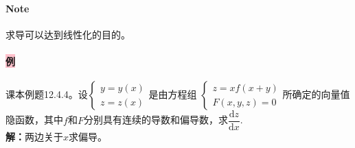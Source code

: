 \documentclass[UTF8]{ctexart}
\renewcommand{\d}{\mathrm{d}}
\begin{document}
        \paragraph{\colorbox{orange!75}{Note}}求导可以达到线性化的目的。

        \paragraph{\colorbox{pink}{例}}课本例题12.4.4。设$\begin{cases}
            y=y(x)\\
            z=z(x)
        \end{cases}$是由方程组
        $\begin{cases}
            z=xf(x+y)\\
            F(x,y,z)=0
        \end{cases}$所确定的向量值隐函数，其中$f$和$F$分别具有连续的导数和偏导数，求$\dfrac{\d z}{\d x}$.\\
        \textbf{解：}两边关于$x$求偏导。
\end{document}
